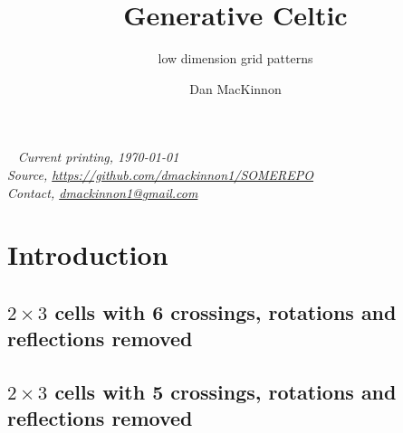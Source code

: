 \documentclass{tufte-book}
\title{Generative Celtic}
\subtitle{low dimension grid patterns}
\author[]{Dan MacKinnon}
\begin{document}
\maketitle


\newpage
\begin{fullwidth}
~\vfill
\thispagestyle{empty}
\setlength{\parindent}{0pt}
\textit{Current printing, \today}\\
\textit{Source, \url{https://github.com/dmackinnon1/SOMEREPO}}\\
\textit{Contact, \href{mailto://dmackinnon1@gmail.com}{dmackinnon1@gmail.com}}
\end{fullwidth}

\cleardoublepage

\chapter*{Introduction}


\newpage

\scalebox{0.6}{
\begin{minipage}{18cm}

\end{minipage}
}

\newpage
\section{$2\times 3$ cells with 6 crossings, rotations and reflections removed}

%

\newpage
\section{$2\times 3$ cells with 5 crossings, rotations and reflections removed}

%
\end{document}
